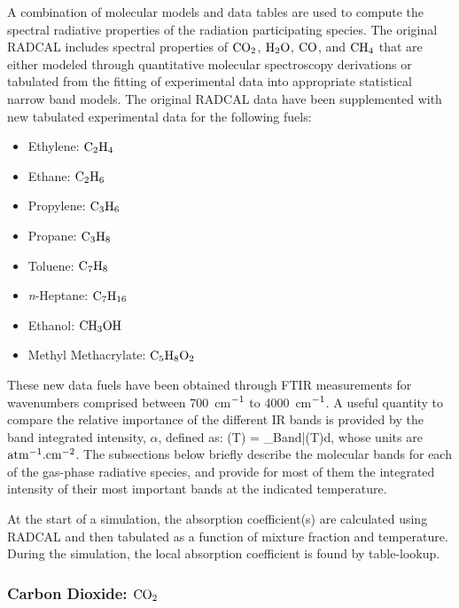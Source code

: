 A combination of molecular models and data tables are used to compute the spectral radiative
properties of the radiation participating species.
The original RADCAL includes spectral properties of $\rm CO_2$, $\rm H_2O$, $\rm CO$, and 
$\rm CH_4$ that are either modeled through quantitative molecular spectroscopy derivations
or tabulated from the fitting of experimental data into appropriate statistical narrow band models.
The original RADCAL data have been supplemented with new tabulated experimental data
 for the following fuels:
 \begin{itemize}
  \item Ethylene:  $\rm C_2H_4$
  \item Ethane:    $\rm C_2H_6$
  \item Propylene: $\rm C_3H_6$
  \item Propane:   $\rm C_3H_8$
  \item Toluene:   $\rm C_7H_8$
  \item \textit{n}-Heptane: $\rm C_7H_{16}$
  \item Ethanol:   $\rm CH_3OH$
  \item Methyl Methacrylate: $\rm C_5H_8O_2$
 \end{itemize}
 These new data fuels have been obtained through FTIR measurements for
 wavenumbers comprised between 700~cm$\rm ^{-1}$ to 4000~cm$\rm ^{-1}$.
 A useful quantity to compare the relative importance of the 
 different IR bands is provided by the band
 integrated intensity, $\alpha$, defined as:
 \be
  \alpha(T) = \displaystyle\int_{Band}\bar{\kappa}(T)d\nu,
 \ee
 whose units are $\rm {atm^{-1}.cm^{-2}}$.
 The subsections below briefly describe the molecular bands 
 for each of the gas-phase radiative species, and provide for most of them
 the integrated intensity of their most important bands
 at the indicated temperature.
 
 At the start of a simulation, the absorption
 coefficient(s) are calculated using RADCAL and then 
 tabulated as a function of mixture fraction and
 temperature. During the simulation, the local absorption coefficient is
 found by table-lookup.
 
 \subsubsection{Carbon Dioxide: $\rm CO_2$}
 
